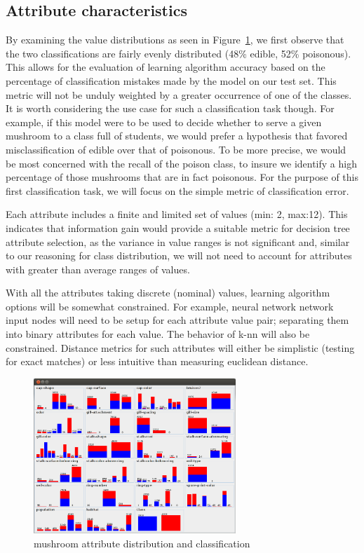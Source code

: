 \documentclass{sig-alternate}
\begin{document}
\subsection{Attribute characteristics}

By examining the value distributions as seen in Figure~\ref{ag-data-viz}, we first observe that the two classifications are fairly evenly distributed (48\% edible, 52\% poisonous). This allows for the evaluation of learning algorithm accuracy based on the percentage of classification mistakes made by the model on our test set. This metric will not be unduly weighted by a greater occurrence of one of the classes. It is worth considering the use case for such a classification task though. For example, if this model were to be used to decide whether to serve a given mushroom to a class full of students, we would prefer a hypothesis that favored misclassification of edible over that of poisonous. To be more precise, we would be most concerned with the recall of the poison class, to insure we identify a high percentage of those mushrooms that are in fact poisonous. For the purpose of this first classification task, we will focus on the simple metric of classification error.

Each attribute includes a finite and limited set of values (min: 2, max:12). This indicates that information gain would provide a suitable metric for decision tree attribute selection, as the variance in value ranges is not significant and, similar to our reasoning for class distribution, we will not need to account for attributes with greater than average ranges of values.

With all the attributes taking discrete (nominal) values, learning algorithm options will be somewhat constrained. For example, neural network network input nodes will need to be setup for each attribute value pair; separating them into binary attributes for each value. The behavior of k-nn will also be constrained. Distance metrics for such attributes will either be simplistic (testing for exact matches) or less intuitive than measuring euclidean distance.

\begin{figure}[!htbp]
    \centering
    \includegraphics[width=3in]{data/agaricus-lepiota/ag-data-viz.png}
    \caption{mushroom attribute distribution and classification \label{ag-data-viz}}
\end{figure} 
\end{document}
